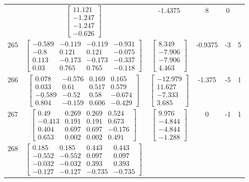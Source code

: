 \documentclass[a4paper,12pt]{article}
\begin{document}
\begin{tabular}{c c c c c c}
&
$\begin{bmatrix} 11.121 \\ -1.247 \\ -1.247 \\ -0.626 \end{bmatrix}$
&
-1.4375
&
8
&
0
\\
265
&
$\begin{bmatrix} -0.589 & -0.119 & -0.119 & -0.931 \\ -0.8 & 0.121 & 0.121 & -0.075 \\ 0.113 & -0.173 & -0.173 & -0.337 \\ 0.03 & 0.765 & 0.765 & -0.118 \end{bmatrix}$
&
$\begin{bmatrix} 8.349 \\ -7.906 \\ -7.906 \\ 4.463 \end{bmatrix}$
&
-0.9375
&
-3
&
5
\\
266
&
$\begin{bmatrix} 0.078 & -0.576 & 0.169 & 0.165 \\ 0.033 & 0.61 & 0.517 & 0.579 \\ -0.589 & -0.52 & 0.58 & -0.674 \\ 0.804 & -0.159 & 0.606 & -0.429 \end{bmatrix}$
&
$\begin{bmatrix} -12.979 \\ 11.627 \\ -7.333 \\ 3.685 \end{bmatrix}$
&
-1.375
&
-5
&
1
\\
267
&
$\begin{bmatrix} 0.49 & 0.269 & 0.269 & 0.524 \\ -0.413 & 0.191 & 0.191 & 0.673 \\ 0.404 & 0.697 & 0.697 & -0.176 \\ 0.653 & 0.002 & 0.002 & 0.491 \end{bmatrix}$
&
$\begin{bmatrix} 9.976 \\ -4.844 \\ -4.844 \\ -1.288 \end{bmatrix}$
&
0
&
-1
&
1
\\
268
&
$\begin{bmatrix} 0.185 & 0.185 & 0.443 & 0.443 \\ -0.552 & -0.552 & 0.097 & 0.097 \\ -0.032 & -0.032 & 0.393 & 0.393 \\ -0.127 & -0.127 & -0.735 & -0.735 \end{bmatrix}$

\end{tabular}
\end{document}
